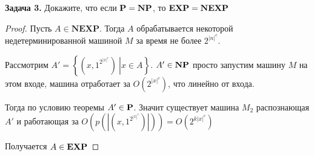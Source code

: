 \textbf{Задача 3.} Докажите, что если $\textbf{P}=\textbf{NP}$, то $\textbf{EXP}=\textbf{NEXP}$

\begin{proof} Пусть $A\in\textbf{NEXP}$. Тогда $A$ обрабатывается некоторой недетерминированной машиной $M$ за время не более $2^{|n|^c}$. 

Рассмотрим $A'=\left\{\left.\left(x,1^{2^{|x|^c}}\right)\ \right|x\in A\right\}$.
$A'\in\textbf{NP}$ просто запустим машину $M$ на этом входе, машина отработает за $O(2^{|x|^c})$, что линейно от входа. 

Тогда по условию теоремы $A'\in \textbf{P}$. Значит существует машина $M_2$ распознающая $A'$ и работающая за $O\left(p\left(\left|\left(x,1^{2^{|x|^c}}\right)\right|\right)\right) = O\left(2^{k|x|^c}\right)$

Получается $A\in\textbf{EXP}$ 
\end{proof}